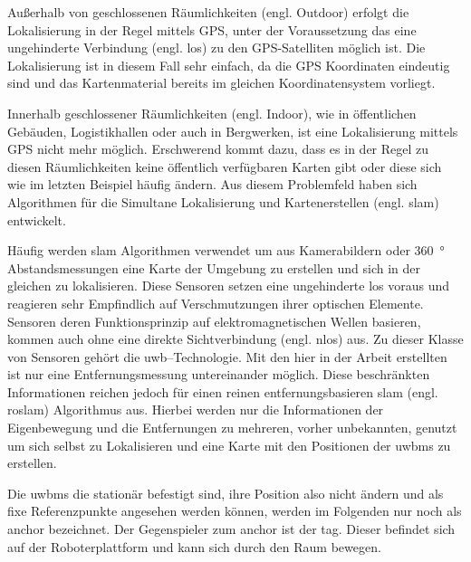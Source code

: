 Außerhalb von geschlossenen Räumlichkeiten (engl. Outdoor) erfolgt die Lokalisierung in der Regel mittels GPS, unter der Voraussetzung das eine ungehinderte Verbindung (engl. \acrfull{los}) zu den GPS-Satelliten möglich ist. Die Lokalisierung ist in diesem Fall sehr einfach, da die GPS Koordinaten eindeutig sind und das Kartenmaterial bereits im gleichen Koordinatensystem vorliegt.

Innerhalb geschlossener Räumlichkeiten (engl. Indoor), wie in öffentlichen Gebäuden, Logistikhallen oder auch in Bergwerken, ist eine Lokalisierung mittels GPS nicht mehr möglich. Erschwerend kommt dazu, dass es in der Regel zu diesen Räumlichkeiten keine öffentlich verfügbaren Karten gibt oder diese sich wie im letzten Beispiel häufig ändern. Aus diesem Problemfeld haben sich Algorithmen für die Simultane Lokalisierung und Kartenerstellen (engl. \Gls{slam}) entwickelt.

Häufig werden \Gls{slam} Algorithmen verwendet um aus Kamerabildern oder \SI{360}{\degree} Abstandsmessungen eine Karte der Umgebung zu erstellen und sich in der gleichen zu lokalisieren. Diese Sensoren setzen eine ungehinderte \Gls{los} voraus und reagieren sehr Empfindlich auf Verschmutzungen ihrer optischen Elemente. Sensoren deren Funktionsprinzip auf elektromagnetischen Wellen basieren, kommen auch ohne eine direkte Sichtverbindung (engl. \Gls{nlos}) aus. Zu dieser Klasse von Sensoren gehört die \Gls{uwb}--Technologie. Mit den hier in der Arbeit erstellten  ist nur eine Entfernungsmessung untereinander möglich. Diese beschränkten Informationen reichen jedoch für einen reinen entfernungsbasieren \Gls{slam} (engl. \gls{roslam}) Algorithmus aus. Hierbei werden nur die Informationen der Eigenbewegung und die Entfernungen zu mehreren, vorher unbekannten,  genutzt um sich selbst zu Lokalisieren und eine Karte mit den Positionen der \Glspl{uwbm} zu erstellen.

Die \Glspl{uwbm} die stationär befestigt sind, ihre Position also nicht ändern und als fixe Referenzpunkte angesehen werden können, werden im Folgenden nur noch als \Gls{anchor} bezeichnet. Der Gegenspieler zum \Gls{anchor} ist der \Gls{tag}. Dieser befindet sich auf der Roboterplattform und kann sich durch den Raum bewegen.


\begin{comment}
------------------------------------------------------------------------------------------
\end{comment}


